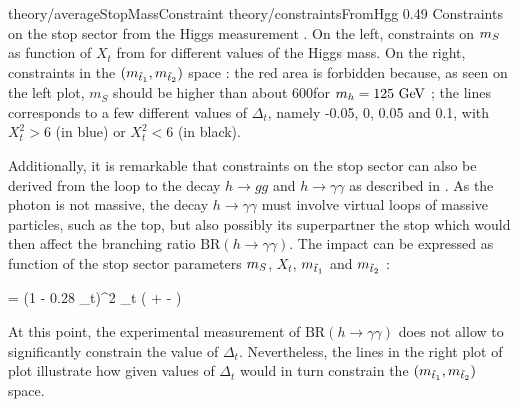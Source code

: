                          {theory/averageStopMassConstraint}
                         {theory/constraintsFromHgg}
                         {0.49}
                         {Constraints on the stop sector from the Higgs measurement \cite{TheLightStopWindow}.
                         On the left, constraints on $m_{S}$ as function of $X_t$ from
                         for different values of the Higgs mass. On the right, constraints
                         in the $(m_{\tilde{t}_1},m_{\tilde{t}_2})$ space : the
                         red area is forbidden because, as seen on the left plot, $m_S$
                         should be higher than about 600\GeV for $m_{h} = 125~\text{GeV}$ ;
                         the lines corresponds to a few different values of $\Delta_t$,
                         namely -0.05, 0, 0.05 and 0.1, with $X_t^2 > 6$ (in blue) or
                         $X_t^2 < 6$ (in black).
                         }

            Additionally, it is remarkable that constraints on the stop sector can also be derived
            from the loop to the decay $h \rightarrow gg$ and $h \rightarrow \gamma \gamma$
            as described in \cite{TheLightStopWindow}. As the photon is not massive,
            the decay $h \rightarrow \gamma \gamma$ must involve virtual loops of massive
            particles, such as the top, but also possibly its superpartner the stop which
            would then affect the branching ratio $\text{BR}(h \rightarrow \gamma\gamma)$.
            The impact can be expressed as function of the stop sector parameters $m_{S}$,
            $X_t$, $m_{\tilde{t}_1}$ and $m_{\tilde{t}_2}$ :

            {
                =
                (1 - 0.28 \Delta_t)^2
                \hspace*{0.5cm}
                \hspace*{0.5cm}
                \Delta_t
                \approx
                \left(
                    +
                    -
                \right)
            }

            At this point, the experimental measurement of $\text{BR}(h\rightarrow\gamma\gamma)$
            does not allow to significantly constrain the value of $\Delta_t$. Nevertheless,
            the lines in the right plot of  plot illustrate
            how given values of $\Delta_t$ would in turn constrain the
            $(m_{\tilde{t}_1},m_{\tilde{t}_2})$ space.

